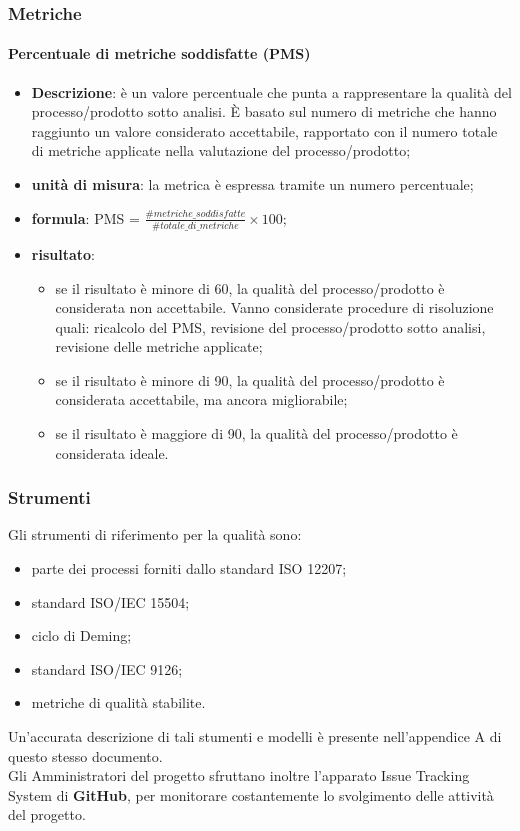 	\subsubsection{Metriche}
		\paragraph{Percentuale di metriche soddisfatte (PMS)}
			\begin{itemize}
				\item \textbf{Descrizione}: è un valore percentuale che punta a rappresentare la qualità del processo/prodotto sotto analisi. È basato sul numero di metriche che hanno raggiunto un valore considerato accettabile, rapportato con il numero totale di metriche applicate nella valutazione del processo/prodotto;
				\item \textbf{unità di misura}: la metrica è espressa tramite un numero percentuale;
				\item \textbf{formula}: PMS = $\displaystyle\frac{\#metriche\_soddisfatte}{\#totale\_di\_metriche}\times100$;
				\item \textbf{risultato}: 
				\begin{itemize}
					\item {se il risultato è minore di 60, la qualità del processo/prodotto è considerata non accettabile. Vanno considerate procedure di risoluzione quali:	ricalcolo del PMS, revisione del processo/prodotto sotto analisi, revisione delle metriche applicate;}
					\item {se il risultato è minore di 90, la qualità del processo/prodotto è considerata accettabile, ma ancora migliorabile;}
					\item {se il risultato è maggiore di 90, la qualità del processo/prodotto è considerata ideale.}
				\end{itemize}
			\end{itemize}	
    \subsubsection{Strumenti}
      Gli strumenti di riferimento per la qualità sono:
      \begin{itemize}
      	\item{parte dei processi forniti dallo standard ISO 12207;}
      	\item{standard ISO/IEC 15504;}
      	\item{ciclo di Deming;}
      	\item{standard ISO/IEC 9126;}
      	\item{metriche di qualità stabilite.}
      \end{itemize}
  	  Un'accurata descrizione di tali stumenti e modelli è presente nell'appendice A di questo stesso documento. \\
  	  Gli Amministratori del progetto sfruttano inoltre l'apparato Issue Tracking System di \textbf{\mbox{GitHub}}, per monitorare costantemente lo svolgimento delle attività del progetto.

